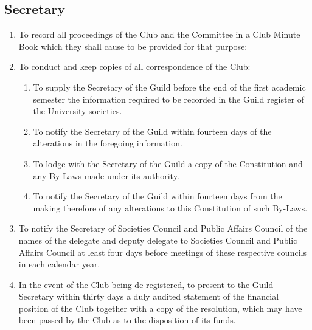 \documentclass[10pt,a4paper]{report}
\begin{document}
		\subsection{Secretary}
			\begin{enumerate}[label=\alph*]
				\item To record all proceedings of the Club and the Committee in a Club Minute Book which they shall cause to be provided for that purpose:
				\item To conduct and keep copies of all correspondence of the Club:
					\begin{enumerate}[label=\roman*]
					\item To supply the Secretary of the Guild before the end of the first academic semester the information required to be recorded in the Guild register of the University societies.
					\item To notify the Secretary of the Guild within fourteen days of the alterations in the foregoing information.
					\item To lodge with the Secretary of the Guild a copy of the Constitution and any By-Laws made under its authority.
					\item To notify the Secretary of the Guild within fourteen days from the making therefore of any alterations to this Constitution of such By-Laws.
					\end{enumerate}
				\item To notify the Secretary of Societies Council and Public Affairs Council of the names of the delegate and deputy delegate to Societies Council and Public Affairs Council at least four days before meetings of these respective councils in each calendar year.
				\item In the event of the Club being de-registered, to present to the Guild Secretary within thirty days a duly audited statement of the financial position of the Club together with a copy of the resolution, which may have been passed by the Club as to the disposition of its funds.
			\end{enumerate}
\end{document}
